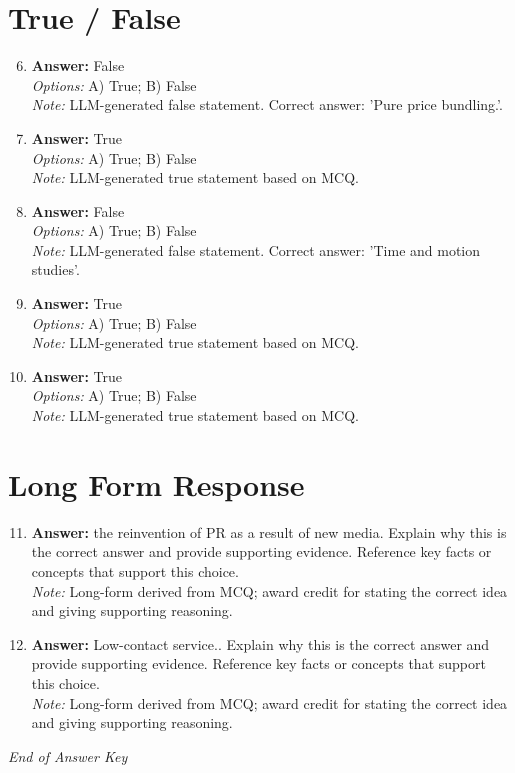 \documentclass[12pt]{article}
\begin{document}
\section*{True / False}
\begin{enumerate}[label=\arabic*.]
\setcounter{enumi}{5}
\item \textbf{Answer:} False
\\ \textit{Options:} A) True; B) False
\\ \textit{Note:} LLM-generated false statement. Correct answer: 'Pure price bundling.'.
\item \textbf{Answer:} True
\\ \textit{Options:} A) True; B) False
\\ \textit{Note:} LLM-generated true statement based on MCQ.
\item \textbf{Answer:} False
\\ \textit{Options:} A) True; B) False
\\ \textit{Note:} LLM-generated false statement. Correct answer: 'Time and motion studies'.
\item \textbf{Answer:} True
\\ \textit{Options:} A) True; B) False
\\ \textit{Note:} LLM-generated true statement based on MCQ.
\item \textbf{Answer:} True
\\ \textit{Options:} A) True; B) False
\\ \textit{Note:} LLM-generated true statement based on MCQ.
\end{enumerate}

\section*{Long Form Response}
\begin{enumerate}[label=\arabic*.]
\setcounter{enumi}{10}
\item \textbf{Answer:} the reinvention of PR as a result of new media. Explain why this is the correct answer and provide supporting evidence. Reference key facts or concepts that support this choice.
\\ \textit{Note:} Long-form derived from MCQ; award credit for stating the correct idea and giving supporting reasoning.
\item \textbf{Answer:} Low-contact service.. Explain why this is the correct answer and provide supporting evidence. Reference key facts or concepts that support this choice.
\\ \textit{Note:} Long-form derived from MCQ; award credit for stating the correct idea and giving supporting reasoning.
\end{enumerate}

\vfill
\noindent\textit{End of Answer Key}
\end{document}
